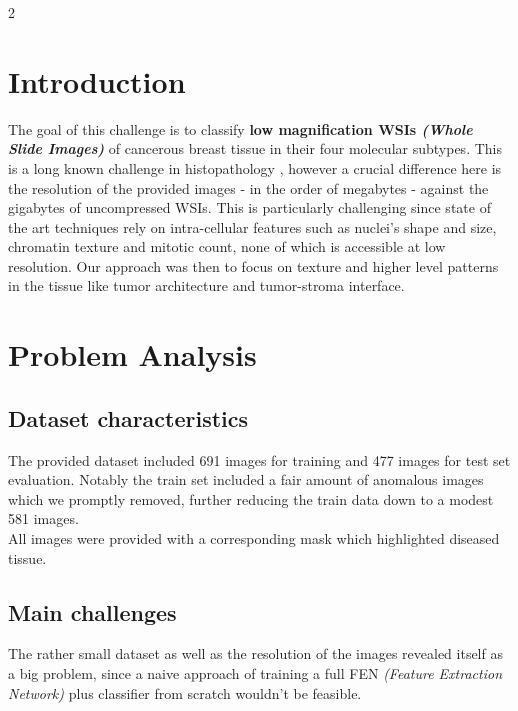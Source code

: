 \documentclass[11pt]{article}
\begin{document}
    \begin{multicols}{2}        
        \section{Introduction}
        The goal of this challenge is to classify \textbf{low magnification WSIs \textit{(Whole Slide Images)}} of cancerous breast tissue in their four molecular subtypes. This is a long known challenge in histopathology \cite{JANOWCZYK201629}, however a crucial difference here is the resolution of the provided images - in the order of megabytes - against the gigabytes of uncompressed WSIs. This is particularly challenging since state of the art techniques rely on intra-cellular features such as nuclei's shape and size, chromatin texture and mitotic count, none of which is accessible at low resolution. Our approach was then to focus on texture and higher level patterns in the tissue like tumor architecture and tumor-stroma interface.
        
        \section{Problem Analysis}
            \subsection{Dataset characteristics}
            The provided dataset included 691 images for training and 477 images for test set evaluation. Notably the train set included a fair amount of anomalous images which we promptly removed, further reducing the train data down to a modest 581 images.\\
            All images were provided with a corresponding mask which highlighted diseased tissue.
            \subsection{Main challenges}
            The rather small dataset as well as the resolution of the images revealed itself as a big problem, since a naive approach of training a full FEN \textit{(Feature Extraction Network)} plus classifier from scratch wouldn't be feasible.


\end{multicols}
\end{document}
